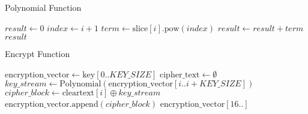 \documentclass{article}
\begin{document}
\begin{algorithm}
\caption{Polynomial Function}
\begin{algorithmic}[1]
    \State $result \gets 0$
        \State $index \gets i + 1$
        \State $term \gets \text{slice}[i].\text{pow}(index)$
        \State $result \gets result + term$
    \EndFor
    \State \Return $result$
\EndFunction
\end{algorithmic}
\end{algorithm}

\begin{algorithm}
\caption{Encrypt Function}
\begin{algorithmic}[1]
    \State $\text{encryption\_vector} \gets \text{key}[0..KEY\_SIZE]$
    \State $\text{cipher\_text} \gets \emptyset$
        \State $key\_stream \gets \text{Polynomial}(\text{encryption\_vector}[i..i + KEY\_SIZE])$
        \State $cipher\_block \gets \text{cleartext}[i] \oplus key\_stream$
        \State $\text{encryption\_vector}.\text{append}(cipher\_block)$
    \EndFor
    \State \Return $\text{encryption\_vector}[16..]$
\EndFunction
\end{algorithmic}
\end{algorithm}
\end{document}
